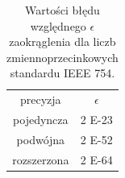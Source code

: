 \begin{table}[h]
        \centering
        \begin{threeparttable}
                \caption{Wartości błędu względnego $\epsilon$ zaokrąglenia dla liczb zmiennoprzecinkowych standardu IEEE 754.}\label{tab:table_exampleazd}
                \begin{tabularx}{0.6\textwidth}{| c | c |}
                        \midrule
                        	precyzja	& $\epsilon$  \\
		pojedyncza  &  2 E-23\\
                        podwójna  &  2 E-52\\
		rozszerzona &  2 E-64\\
                        \bottomrule
                \end{tabularx}
        \end{threeparttable}
\end{table}




